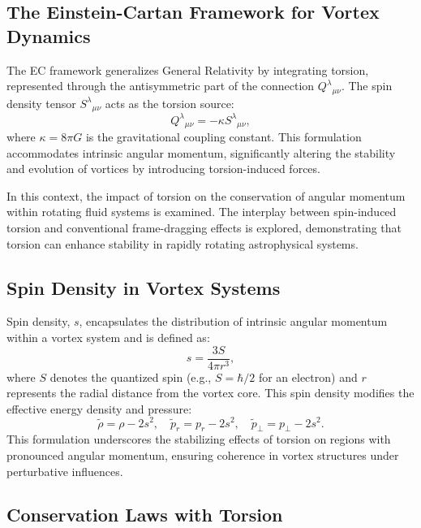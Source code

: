 \subsection*{The Einstein-Cartan Framework for Vortex Dynamics}


The EC framework generalizes General Relativity by integrating torsion, represented through the antisymmetric part of the connection $Q^{\lambda}{}_{\mu\nu}$. The spin density tensor $S^{\lambda}{}_{\mu\nu}$ acts as the torsion source:
\begin{equation*}
Q^{\lambda}{}_{\mu\nu} = -\kappa S^{\lambda}{}_{\mu\nu},
\end{equation*}
where $\kappa = 8\pi G$ is the gravitational coupling constant. This formulation accommodates intrinsic angular momentum, significantly altering the stability and evolution of vortices by introducing torsion-induced forces.


In this context, the impact of torsion on the conservation of angular momentum within rotating fluid systems is examined. The interplay between spin-induced torsion and conventional frame-dragging effects is explored, demonstrating that torsion can enhance stability in rapidly rotating astrophysical systems.


\subsection*{Spin Density in Vortex Systems}


Spin density, $s$, encapsulates the distribution of intrinsic angular momentum within a vortex system and is defined as:
\begin{equation*}
s = \frac{3S}{4\pi r^3},
\end{equation*}
where $S$ denotes the quantized spin (e.g., $S = \hbar/2$ for an electron) and $r$ represents the radial distance from the vortex core. This spin density modifies the effective energy density and pressure:
\begin{equation*}
\tilde{\rho} = \rho - 2s^2, \quad \tilde{p}_r = p_r - 2s^2, \quad \tilde{p}_{\perp} = p_{\perp} - 2s^2.
\end{equation*}
This formulation underscores the stabilizing effects of torsion on regions with pronounced angular momentum, ensuring coherence in vortex structures under perturbative influences.


\subsection*{Conservation Laws with Torsion}



